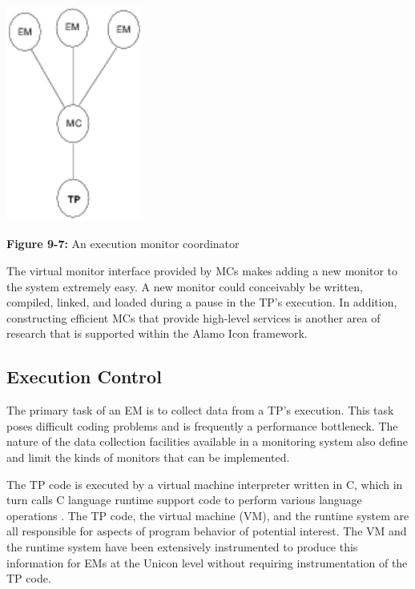 \begin{center}
\includegraphics[height=2.8in]{mcover.png}
\end{center}

{\sffamily\bfseries Figure 9-7:}
{\sffamily An execution monitor coordinator}

\bigskip

The virtual monitor interface provided by MCs makes adding a new monitor to
the system extremely easy.  A new monitor could conceivably be written,
compiled, linked, and loaded during a pause in the TP's execution. In
addition, constructing efficient MCs that provide high-level services is
another area of research that is supported within the Alamo Icon framework.

\subsection{Execution Control}

The primary task of an EM is to collect data from a TP's execution.
This task poses difficult coding problems and is frequently a
performance bottleneck. The nature of the data collection facilities
available in a monitoring system also define and limit the kinds of
monitors that can be implemented.

The TP code is executed by a
virtual machine interpreter written in C, which in turn calls C
language runtime support code to perform various language operations
\cite{Griswold86}.
The TP code, the virtual machine (VM), and the runtime system are all
responsible for aspects of program behavior of potential interest.  The VM
and the runtime system have been extensively instrumented to produce this
information for EMs at the Unicon level without requiring instrumentation
of the TP code.

